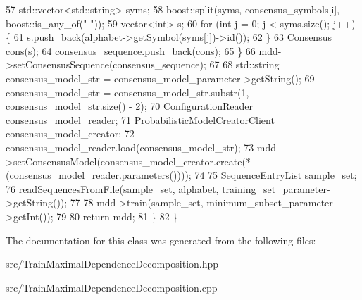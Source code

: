 \begin{DoxyCode}
57         std::vector<std::string> syms;
58         boost::split(syms, consensus\_symbols[i], boost::is\_any\_of(\textcolor{stringliteral}{" "}));
59         vector<int> s;
60         \textcolor{keywordflow}{for} (\textcolor{keywordtype}{int} j = 0; j < syms.size(); j++) \{
61           s.push\_back(alphabet->getSymbol(syms[j])->id());
62         \}
63         Consensus cons(s);
64         consensus\_sequence.push\_back(cons);
65       \}
66       mdd->setConsensusSequence(consensus\_sequence);
67 
68       std::string consensus\_model\_str = consensus\_model\_parameter->getString();
69       consensus\_model\_str = consensus\_model\_str.substr(1, consensus\_model\_str.size() - 2);
70       ConfigurationReader consensus\_model\_reader;
71       ProbabilisticModelCreatorClient consensus\_model\_creator;
72       consensus\_model\_reader.load(consensus\_model\_str);
73       mdd->setConsensusModel(consensus\_model\_creator.create(*(consensus\_model\_reader.parameters())));
74 
75       SequenceEntryList sample\_set;
76       readSequencesFromFile(sample\_set, alphabet, training\_set\_parameter->getString());
77       
78       mdd->train(sample\_set, minimum\_subset\_parameter->getInt());
79 
80       \textcolor{keywordflow}{return} mdd;
81     \}
82   \}
\end{DoxyCode}


The documentation for this class was generated from the following files\+:\begin{DoxyCompactItemize}
\item 
src/Train\+Maximal\+Dependence\+Decomposition.\+hpp\item 
src/Train\+Maximal\+Dependence\+Decomposition.\+cpp\end{DoxyCompactItemize}
